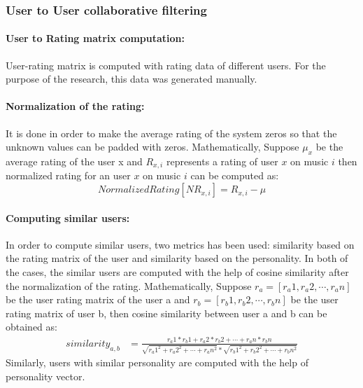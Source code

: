 \documentclass[journal]{IEEEtran}
\begin{document}
\subsubsection{User to User collaborative filtering}

  \paragraph{User to Rating matrix computation:} User-rating matrix is computed with rating data of different users. For the purpose of the research, this data was generated manually.
  \paragraph{Normalization of the rating:} It is done in order to make the average rating of the system zeros so that the unknown values can be padded with zeros.
Mathematically,
Suppose $\mu_x$ be the average rating of the user x and $R_{x,i}$ represents a rating of user $x$ on music $i$ then normalized rating for an user $x$ on music $i$ can be computed as:
\begin{equation}\label{eq:normal}
  Normalized Rating[NR_{x,i}] = R_{x,i} - \mu
\end{equation}
\paragraph{Computing similar users:} In order to compute similar users, two metrics has been used: similarity based on the rating matrix of the user and similarity based on the personality. In both of the cases, the similar users are computed with the help of cosine similarity after the normalization of the rating.
Mathematically,
Suppose $r_a = [r_a1,r_a2,\cdots,r_an]$ be the user rating matrix of the user a and  $r_b = [r_b1,r_b2,\cdots,r_bn]$ be the user rating matrix of user b, then cosine similarity between user a and b can be obtained as:\\
\begin{equation}
\begin{aligned}

  similarity_{a,b} 
  & = \frac{r_a1*r_b1 + r_a2*r_b2 +\cdots+ r_an*r_bn}{\sqrt{{r_a1}^2+{r_a2}^2+\cdots+{r_an}^2} * \sqrt{{r_b1}^2+{r_b2}^2+\cdots+{r_bn}^2} }

\end{aligned}
\end{equation}
Similarly, users with similar personality are computed with the help of personality vector.\hfill
\end{document}
